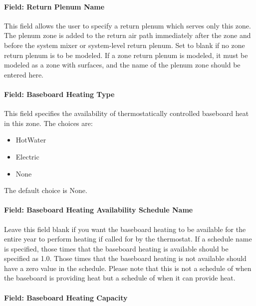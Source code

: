\paragraph{Field: Return Plenum Name}\label{field-return-plenum-name-2}

This field allows the user to specify a return plenum which serves only this zone. The plenum zone is added to the return air path immediately after the zone and before the system mixer or system-level return plenum. Set to blank if no zone return plenum is to be modeled. If a zone return plenum is modeled, it must be modeled as a zone with surfaces, and the name of the plenum zone should be entered here.

\paragraph{Field: Baseboard Heating Type}\label{field-baseboard-heating-type-8}

This field specifies the availability of thermostatically controlled baseboard heat in this zone. The choices are:

\begin{itemize}
\item
  HotWater
\item
  Electric
\item
  None
\end{itemize}

The default choice is None.

\paragraph{Field: Baseboard Heating Availability Schedule Name}\label{field-baseboard-heating-availability-schedule-name-8}

Leave this field blank if you want the baseboard heating to be available for the entire year to perform heating if called for by the thermostat. If a schedule name is specified, those times that the baseboard heating is available should be specified as 1.0. Those times that the baseboard heating is not available should have a zero value in the schedule. Please note that this is not a schedule of when the baseboard is providing heat but a schedule of when it can provide heat.

\paragraph{Field: Baseboard Heating Capacity}\label{field-baseboard-heating-capacity-8}

